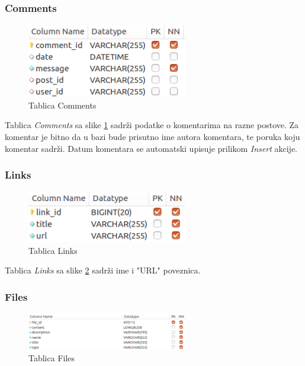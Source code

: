 \documentclass[zavrsni, numeric]{fer}
\begin{document}
\subsubsection{Comments}

\begin{figure}[H]
	\centering
	\includegraphics[width=7cm]{slike/t-comments.png}
	\caption{Tablica Comments}
	\label{fig:t-comments}
\end{figure}

Tablica \textit{Comments} sa slike \ref{fig:t-comments} sadrži podatke o komentarima na razne postove. Za komentar je bitno da u bazi bude prisutno ime autora komentara, te poruka koju komentar sadrži. Datum komentara se automatski upisuje prilikom \textit{Insert} akcije.

\subsubsection{Links}

\begin{figure}[H]
	\centering
	\includegraphics[width=7cm]{slike/t-links.png}
	\caption{Tablica Links}
	\label{fig:t-links}
\end{figure}

Tablica \textit{Links} sa slike \ref{fig:t-links} sadrži ime i "URL" poveznica.

\subsubsection{Files}

\begin{figure}[H]
	\centering
	\includegraphics[width=7cm]{slike/t-files.png}
	\caption{Tablica Files}
	\label{fig:t-files}
\end{figure}
\end{document}
